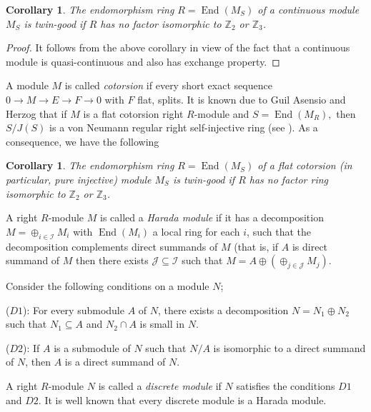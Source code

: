 \documentclass{amsart}
\newtheorem{corollary}[theorem]{Corollary}
\begin{document}
\begin{corollary}
The endomorphism ring $R=\operatorname{End}(M_S)$ of a continuous module $M_S$ is twin-good if $R$ has no factor isomorphic to $\mathbb{Z}_{2}$ or $\mathbb Z_3$.
\end{corollary}

\begin{proof}
It follows from the above corollary in view of the fact that a continuous module is quasi-continuous and also has exchange property.
\end{proof}

\noindent A module $M$ is called \textit{cotorsion} if every short exact sequence $0\longrightarrow
M\longrightarrow E\longrightarrow F\longrightarrow 0$ with $F$ flat, splits. It is known due to Guil Asensio and Herzog that if $M$ is a
flat cotorsion right $R$-module and $S=\operatorname{End}(M_{R}),$ then $S/J(S)$ is a von Neumann regular right self-injective ring (see \cite{gh}). As a consequence, we have the following

\begin{corollary}
The endomorphism ring $R=\operatorname{End}(M_S)$ of a flat cotorsion (in particular, pure injective) module $M_S$ is twin-good if $R$ has no factor ring isomorphic to $\mathbb{Z}_{2}$ or $\mathbb Z_3$.
\end{corollary}

\noindent A right $R$-module $M$ is called a {\it Harada module} if it has a decomposition $M=\oplus_{i\in \mathcal I}M_i$ with $\operatorname{End}(M_i)$ a local ring for each $i$, such that the decomposition complements direct summands of $M$ (that is, if $A$ is direct  summand of $M$ then there exists $\mathcal J\subseteq \mathcal I$ such that $M = A\oplus (\oplus_{j\in \mathcal J}M_j)$. 

\bigskip

\noindent Consider the following conditions on a module $N$;

\bigskip

\noindent ($D1$): For every submodule $A$ of $N$, there exists a decomposition $N=N_1\oplus N_2$ such that $N_1\subseteq A$ and $N_2\cap A$ is small in $N$.

\bigskip

\noindent ($D2$): If $A$ is a submodule of $N$ such that $N/A$ is isomorphic to a direct summand of $N$, then $A$ is a direct summand of $N$.

\bigskip

A right $R$-module $N$ is called a {\it discrete module} if $N$ satisfies the conditions $D1$ and $D2$. It is well known that every discrete module is a Harada module. 
\end{document}
